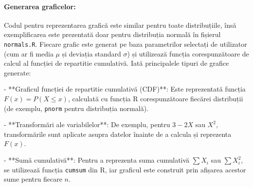 \documentclass[a4paper,11pt]{article}
\begin{document}
\paragraph{Generarea graficelor:}  
Codul pentru reprezentarea grafică este similar pentru toate distribuțiile, însă exemplificarea este prezentată doar pentru distribuția normală în fișierul \texttt{normals.R}.  
Fiecare grafic este generat pe baza parametrilor selectați de utilizator (cum ar fi media \(\mu\) și deviația standard \(\sigma\)) și utilizează funcția corespunzătoare de calcul al funcției de repartitie cumulativă. Iată principalele tipuri de grafice generate:

- **Graficul funcției de repartitie cumulativă (CDF)**: Este reprezentată funcția \( F(x) = P(X \leq x) \), calculată cu funcția R corespunzătoare fiecărei distribuții (de exemplu, \texttt{pnorm} pentru distribuția normală).
  
- **Transformări ale variabilelor**: De exemplu, pentru \( 3 - 2X \) sau \( X^2 \), transformările sunt aplicate asupra datelor înainte de a calcula și reprezenta \( F(x) \).
  
- **Sumă cumulativă**: Pentru a reprezenta suma cumulativă \( \sum X_i \) sau \( \sum X_i^2 \), se utilizează funcția \texttt{cumsum} din R, iar graficul este construit prin afișarea acestor sume pentru fiecare \( n \).
\end{document}
